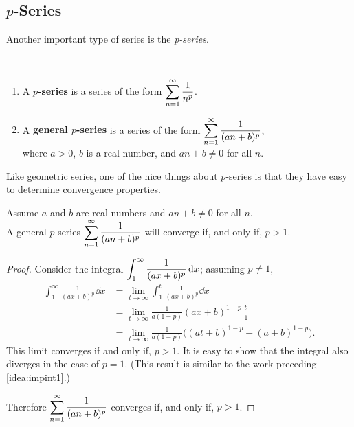 \subsection{\texorpdfstring{$p$}{p}-Series}

Another important type of series is the \emph{p-series}.

\begin{definition}\label{def:pseries}%
\mbox{}\\[-2\baselineskip]\parbox[t]{\linewidth}{%
\begin{enumerate}
\item	A \textbf{$p$-series} is a series of the form
\qquad$\displaystyle\sum_{n=1}^\infty \frac{1}{n^p}$.
\item	A \textbf{general $p$-series} is a series of the form 
\qquad$\displaystyle\sum_{n=1}^\infty \frac{1}{(an+b)^p}$,\medskip\\
where $a>0$, $b$ is a real number, and $an+b\neq 0$ for all $n$.
\end{enumerate}}
\end{definition}

Like geometric series, one of the nice things about $p$-series is that they have easy to determine convergence properties.

\begin{theorem}\label{thm:pseries}%
Assume $a$ and $b$ are real numbers and  $an+b\neq 0$ for all $n$.\\
A general $p$-series $\displaystyle\sum_{n=1}^\infty \frac{1}{(an+b)^p}$ will converge if, and only if, $p>1$.
\end{theorem}

\begin{proof}
Consider the integral $\displaystyle\int_1^\infty \frac1{(ax+b)^p}\operatorname{d}\! x$; assuming $p\neq 1$,
\begin{align*}
	\int_1^\infty \frac1{(ax+b)^p}\dd x
	&= \lim_{t\to\infty} \int_1^t \frac1{(ax+b)^p}\dd x \\
	&= \lim_{t\to\infty} \frac{1}{a(1-p)}(ax+b)^{1-p}\Big|_1^t\\
	&= \lim_{t\to\infty} \frac{1}{a(1-p)}\bigl((at+b)^{1-p}-(a+b)^{1-p}\bigr).
\end{align*}
This limit converges if and only if, $p>1$. It is easy to show that the integral also diverges in the case of $p=1$. (This result is similar to the work preceding \autoref{idea:impint1}.)

Therefore $\displaystyle \sum_{n=1}^\infty \frac 1{(an+b)^p}$ converges if, and only if, $p>1$.
\end{proof}

